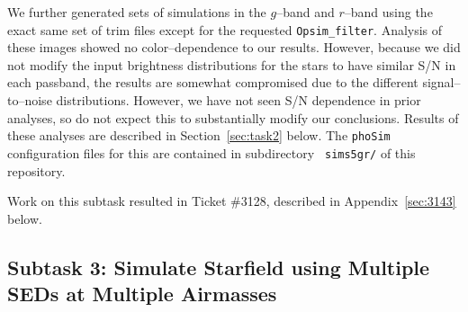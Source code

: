 \documentclass[DM,toc]{lsstdoc}
\begin{document}
We further generated sets of simulations in the $g$--band and
$r$--band using the exact same set of trim files except for the
requested {\tt Opsim\_filter}.  Analysis of these images showed no
color--dependence to our results.  However, because we did not modify
the input brightness distributions for the stars to have similar S/N
in each passband, the results are somewhat compromised due to the
different signal--to--noise distributions.  However, we have not seen
S/N dependence in prior analyses, so do not expect this to
substantially modify our conclusions.  Results of these analyses are
described in Section~\ref{sec:task2} below.  The {\tt phoSim}
configuration files for this are contained in subdirectory {\tt
  sims5gr/} of this repository.

Work on this subtask resulted in Ticket \#3128, described in
Appendix~\ref{sec:3143} below.

\subsection{Subtask 3: Simulate Starfield using Multiple SEDs at Multiple Airmasses}
\end{document}
